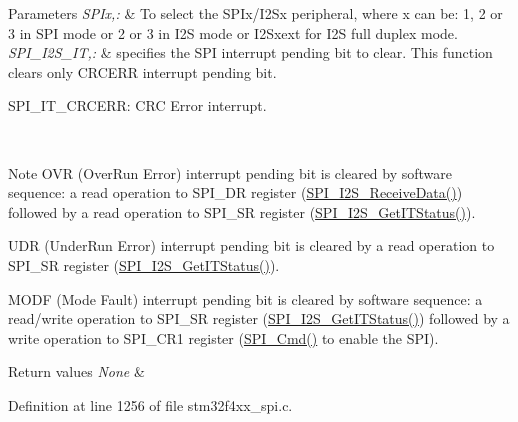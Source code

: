 \begin{DoxyParams}{Parameters}
{\em S\-P\-Ix,\-:} & To select the S\-P\-Ix/\-I2\-Sx peripheral, where x can be\-: 1, 2 or 3 in S\-P\-I mode or 2 or 3 in I2\-S mode or I2\-Sxext for I2\-S full duplex mode. \\
\hline
{\em S\-P\-I\-\_\-\-I2\-S\-\_\-\-I\-T,\-:} & specifies the S\-P\-I interrupt pending bit to clear. This function clears only C\-R\-C\-E\-R\-R interrupt pending bit. \begin{DoxyItemize}
\item S\-P\-I\-\_\-\-I\-T\-\_\-\-C\-R\-C\-E\-R\-R\-: C\-R\-C Error interrupt.\end{DoxyItemize}
\\
\hline
\end{DoxyParams}
\begin{DoxyNote}{Note}
O\-V\-R (Over\-Run Error) interrupt pending bit is cleared by software sequence\-: a read operation to S\-P\-I\-\_\-\-D\-R register (\hyperlink{group___s_p_i_gab77de76547f3bff403236b263b070a30}{S\-P\-I\-\_\-\-I2\-S\-\_\-\-Receive\-Data()}) followed by a read operation to S\-P\-I\-\_\-\-S\-R register (\hyperlink{group___s_p_i_ga72decbc1cd79f8fad92a2204beca6bc5}{S\-P\-I\-\_\-\-I2\-S\-\_\-\-Get\-I\-T\-Status()}). 

U\-D\-R (Under\-Run Error) interrupt pending bit is cleared by a read operation to S\-P\-I\-\_\-\-S\-R register (\hyperlink{group___s_p_i_ga72decbc1cd79f8fad92a2204beca6bc5}{S\-P\-I\-\_\-\-I2\-S\-\_\-\-Get\-I\-T\-Status()}). 

M\-O\-D\-F (Mode Fault) interrupt pending bit is cleared by software sequence\-: a read/write operation to S\-P\-I\-\_\-\-S\-R register (\hyperlink{group___s_p_i_ga72decbc1cd79f8fad92a2204beca6bc5}{S\-P\-I\-\_\-\-I2\-S\-\_\-\-Get\-I\-T\-Status()}) followed by a write operation to S\-P\-I\-\_\-\-C\-R1 register (\hyperlink{group___s_p_i_gaa31357879a65ee1ed7223f3b9114dcf3}{S\-P\-I\-\_\-\-Cmd()} to enable the S\-P\-I). 
\end{DoxyNote}

\begin{DoxyRetVals}{Return values}
{\em None} & \\
\hline
\end{DoxyRetVals}


Definition at line 1256 of file stm32f4xx\-\_\-spi.\-c.

